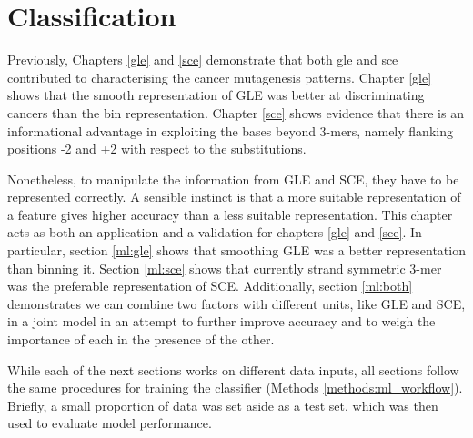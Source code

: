 \chapter{Classification}\label{ml}

Previously, Chapters \ref{gle} and \ref{sce} demonstrate that both \gls{gle} and \gls{sce} contributed to characterising the cancer mutagenesis patterns. Chapter \ref{gle} shows that the smooth representation of GLE was better at discriminating cancers than the bin representation. Chapter \ref{sce} shows evidence that there is an informational advantage in exploiting the bases beyond 3-mers, namely flanking positions -2 and +2 with respect to the substitutions. 

Nonetheless, to manipulate the information from GLE and SCE, they have to be represented correctly. A sensible instinct is that a more suitable representation of a feature gives higher accuracy than a less suitable representation. This chapter acts as both an application and a validation for chapters \ref{gle} and \ref{sce}. In particular, section \ref{ml:gle} shows that smoothing GLE was a better representation than binning it. Section \ref{ml:sce} shows that currently strand symmetric 3-mer was the preferable representation of SCE. Additionally, section \ref{ml:both} demonstrates we can combine two factors with different units, like GLE and SCE, in a joint model in an attempt to further improve accuracy and to weigh the importance of each in the presence of the other.

While each of the next sections works on different data inputs, all sections follow the same procedures for training the classifier (Methods \ref{methods:ml_workflow}). Briefly, a small proportion of data was set aside as a test set, which was then used to evaluate model performance.

